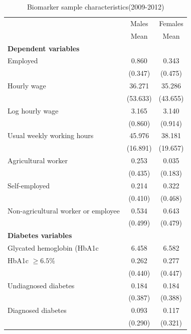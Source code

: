 \documentclass[12pt,english,british]{article}
\begin{document}
\begin{table}[h!]
\caption{\label{tab:Biomarker-sample-characteristics}Biomarker sample characteristics(2009-2012)}
\begin{center}
\begin{adjustbox}{max width=\textwidth}
\begin{tabular}{l*{2}{c}}
\toprule
                    &\multicolumn{1}{c}{Males}&\multicolumn{1}{c}{Females}\\
                    &        Mean&        Mean\\
\midrule
\textbf{Dependent variables} && \\
Employed            &       0.860&       0.343\\
                    &     (0.347)&     (0.475)\\
Hourly wage            &      36.271&      35.286\\
                    &    (53.633)&    (43.655)\\
Log hourly wage     &       3.165&       3.140\\
                    &     (0.860)&     (0.914)\\
Usual weekly working hours&      45.976&      38.181\\
                    &    (16.891)&    (19.657)\\
Agricultural worker &       0.253&       0.035\\
                    &     (0.435)&     (0.183)\\
Self-employed       &       0.214&       0.322\\
                    &     (0.410)&     (0.468)\\
Non-agricultural worker or employee&       0.534&       0.643\\
                    &     (0.499)&     (0.479)\\
\textbf{Diabetes variables} && \\
Glycated hemoglobin (HbA1c&       6.458&       6.582\\
HbA1c $\geq 6.5\%$&       0.262&       0.277\\
                    &     (0.440)&     (0.447)\\
Undiagnosed diabetes&       0.184&       0.184\\
                    &     (0.387)&     (0.388)\\
Diagnosed diabetes  &       0.093&       0.117\\
                    &     (0.290)&     (0.321)\\

\end{tabular}
\end{adjustbox}
\end{center}
\end{table}
\end{document}
